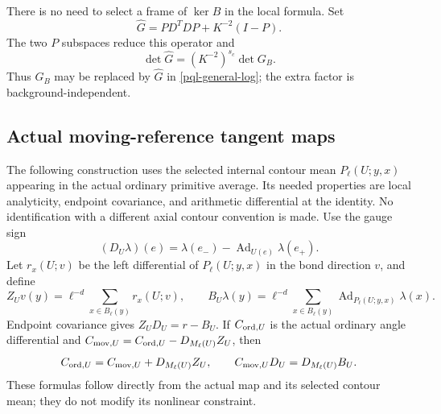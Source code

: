 \documentclass[11pt]{article}
\theoremstyle{remark}
\begin{document}
There is no need to select a frame of $\ker B$ in the local formula.
Set
\begin{equation}
 \widehat G=P D^TD P+K^{-2}(I-P).
 \label{pql-full-scalar}
\end{equation}
The two $P$ subspaces reduce this operator and
\begin{equation}
 \det\widehat G=(K^{-2})^{s_c}\det G_B.
 \label{pql-scalar-completion}
\end{equation}
Thus $G_B$ may be replaced by $\widehat G$ in
\eqref{pql-general-log}; the extra factor is background-independent.

\subsection{Actual moving-reference tangent maps}
\label{pql-source-maps}

The following construction uses the selected internal contour mean
$P_\ell(U;y,x)$ appearing in the actual ordinary primitive average.
Its needed properties are local analyticity, endpoint covariance,
and arithmetic differential at the identity. No identification with
a different axial contour convention is made.
Use the gauge sign
\[
 (D_U\lambda)(e)=\lambda(e_-)
                  -\operatorname{Ad}_{U(e)}\lambda(e_+).
\]
Let $r_x(U;v)$ be the left differential of $P_\ell(U;y,x)$ in the
bond direction $v$, and define
\begin{equation}
 Z_Uv(y)=\ell^{-d}\sum_{x\in B_\ell(y)}r_x(U;v),\qquad
 B_U\lambda(y)=\ell^{-d}\sum_{x\in B_\ell(y)}
               \operatorname{Ad}_{P_\ell(U;y,x)}\lambda(x).
 \label{pql-primitive-scalar}
\end{equation}
Endpoint covariance gives
$Z_UD_U=r-B_U$. If $C_{{\rm ord},U}$ is the actual ordinary
angle differential and
$C_{{\rm mov},U}=C_{{\rm ord},U}-D_{M_\ell(U)}Z_U$, then
\begin{equation}
 C_{{\rm ord},U}=C_{{\rm mov},U}+D_{M_\ell(U)}Z_U,
 \qquad C_{{\rm mov},U}D_U=D_{M_\ell(U)}B_U.
 \label{pql-primitive-tangent}
\end{equation}
These formulas follow directly from the actual map and its selected
contour mean; they do not modify its nonlinear constraint.
\end{document}
